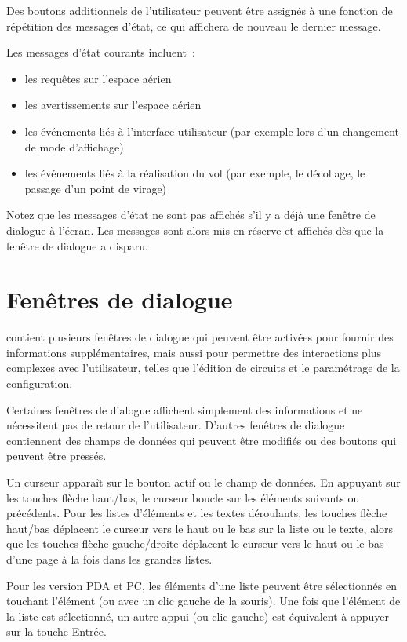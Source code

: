 Des boutons additionnels de l'utilisateur peuvent être assignés à une fonction de répétition des messages d'état,
ce qui affichera de nouveau le dernier message.

Les messages d'état courants incluent~:
\begin{itemize}
\item les requêtes sur l'espace aérien
\item les avertissements sur l'espace aérien
\item les événements liés à l'interface utilisateur (par exemple lors d'un changement de mode d'affichage)
\item les événements liés à la réalisation du vol (par exemple, le décollage, le passage d'un point de virage)
\end{itemize}

Notez que les messages d'état ne sont pas affichés s'il y a déjà une fenêtre de dialogue à l'écran.
Les messages sont alors mis en réserve et affichés dès que la fenêtre de dialogue a disparu.

\section{Fenêtres de dialogue}\label{sec:dialog-windows}

\xc{} contient plusieurs fenêtres de dialogue qui peuvent être activées pour 
fournir des informations supplémentaires, mais aussi pour permettre des interactions plus complexes avec
l'utilisateur, telles que l'édition de circuits et le paramétrage de la configuration.

Certaines fenêtres de dialogue affichent simplement des informations et ne nécessitent pas de retour de l'utilisateur. D'autres
fenêtres de dialogue contiennent des champs de données qui peuvent être modifiés ou des boutons qui peuvent être pressés.

Un curseur apparaît sur le bouton actif ou le champ de données. En appuyant sur les
touches flèche haut/bas, le curseur boucle
sur les éléments suivants ou précédents. Pour les listes d'éléments et les textes déroulants, les
touches flèche haut/bas déplacent le curseur vers le haut ou le bas sur la liste ou le texte, alors
que les touches flèche gauche/droite déplacent le curseur vers le haut ou le bas d'une page à la fois dans les grandes listes.

Pour les version PDA et PC, les éléments d'une liste peuvent être sélectionnés en touchant l'élément (ou
avec un clic gauche de la souris). Une fois que l'élément de la liste est sélectionné, un autre appui
(ou clic gauche) est équivalent à appuyer sur la touche Entrée.

